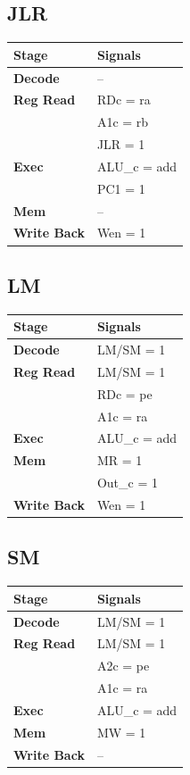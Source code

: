 \documentclass{article}
\begin{document}
\subsection*{JLR}
\begin{tabular}{|l|l|}
\hline
\textbf{Stage} & \textbf{Signals}\\
\hline
\textbf{Decode} & --\\
\hline
\textbf{Reg Read} & RDc = ra\\
                  & A1c = rb\\
                  & JLR = 1\\
\hline
\textbf{Exec} & ALU\_c = add\\
              & PC1 = 1\\
\hline
\textbf{Mem} & --\\
\hline
\textbf{Write Back} & Wen = 1\\
\hline
\end{tabular}

\subsection*{LM}
\begin{tabular}{|l|l|}
\hline
\textbf{Stage} & \textbf{Signals}\\
\hline
\textbf{Decode} & LM/SM = 1\\
\hline
\textbf{Reg Read} & LM/SM = 1\\
                  & RDc = pe\\
                  & A1c = ra\\
\hline
\textbf{Exec} & ALU\_c = add\\
\hline
\textbf{Mem} & MR = 1\\
             & Out\_c = 1\\
\hline
\textbf{Write Back} & Wen = 1\\
\hline
\end{tabular}

\subsection*{SM}
\begin{tabular}{|l|l|}
\hline
\textbf{Stage} & \textbf{Signals}\\
\hline
\textbf{Decode} & LM/SM = 1\\
\hline
\textbf{Reg Read} & LM/SM = 1\\
                  & A2c = pe\\
                  & A1c = ra\\
\hline
\textbf{Exec} & ALU\_c = add\\
\hline
\textbf{Mem} & MW = 1\\
\hline
\textbf{Write Back} & --\\
\hline
\end{tabular}
\end{document}
